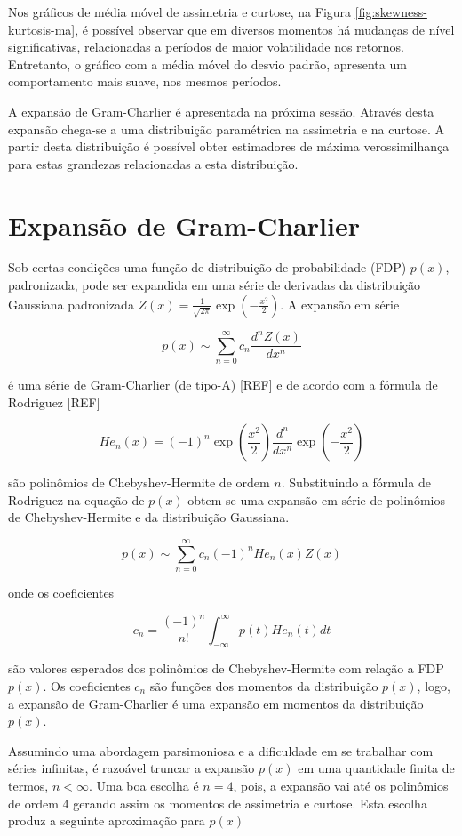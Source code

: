 \documentclass[]{article}
\begin{document}
Nos gráficos de média móvel de assimetria e curtose, na Figura
\ref{fig:skewness-kurtosis-ma}, é possível observar que em diversos
momentos há mudanças de nível significativas, relacionadas a períodos de
maior volatilidade nos retornos. Entretanto, o gráfico com a média móvel
do desvio padrão, apresenta um comportamento mais suave, nos mesmos
períodos.

A expansão de Gram-Charlier é apresentada na próxima sessão. Através
desta expansão chega-se a uma distribuição paramétrica na assimetria e
na curtose. A partir desta distribuição é possível obter estimadores de
máxima verossimilhança para estas grandezas relacionadas a esta
distribuição.

\section{Expansão de Gram-Charlier}\label{expansao-de-gram-charlier}

Sob certas condições uma função de distribuição de probabilidade (FDP)
\(p(x)\), padronizada, pode ser expandida em uma série de derivadas da
distribuição Gaussiana padronizada
\(Z(x) = \frac{1}{\sqrt{2\pi}}\exp\left(-\frac{x^2}{2}\right)\). A
expansão em série

\[
p(x) \sim \sum_{n=0}^\infty c_n \frac{d^n Z(x)}{dx^n}
\]

é uma série de Gram-Charlier (de tipo-A) {[}REF{]} e de acordo com a
fórmula de Rodriguez {[}REF{]}

\[
He_n(x) = (-1)^n \exp\left( \frac{x^2}{2} \right) \frac{d^n}{dx^n} \exp\left( -\frac{x^2}{2} \right)
\]

são polinômios de Chebyshev-Hermite de ordem \(n\). Substituindo a
fórmula de Rodriguez na equação de \(p(x)\) obtem-se uma expansão em
série de polinômios de Chebyshev-Hermite e da distribuição Gaussiana.

\[
p(x) \sim \sum_{n=0}^\infty c_n (-1)^n He_n(x) Z(x)
\]

onde os coeficientes

\[
c_n = \frac{(-1)^n}{n!} \int_{-\infty}^{\infty} p(t) He_n(t) dt
\]

são valores esperados dos polinômios de Chebyshev-Hermite com relação a
FDP \(p(x)\). Os coeficientes \(c_n\) são funções dos momentos da
distribuição \(p(x)\), logo, a expansão de Gram-Charlier é uma expansão
em momentos da distribuição \(p(x)\).

Assumindo uma abordagem parsimoniosa e a dificuldade em se trabalhar com
séries infinitas, é razoável truncar a expansão \(p(x)\) em uma
quantidade finita de termos, \(n < \infty\). Uma boa escolha é \(n=4\),
pois, a expansão vai até os polinômios de ordem 4 gerando assim os
momentos de assimetria e curtose. Esta escolha produz a seguinte
aproximação para \(p(x)\)
\end{document}
